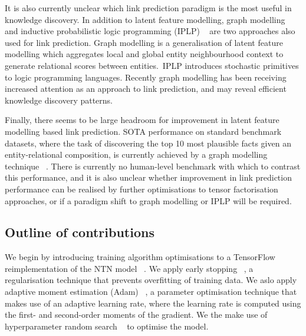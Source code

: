 \noindent It is also currently unclear which link prediction paradigm is the most useful in knowledge discovery. In addition to latent feature modelling, graph modelling \unskip~\citep{niepert2016discriminative, schlichtkrull2018modeling, pinter-eisenstein-2018-predicting} and inductive probabilistic logic programming (IPLP) \unskip ~\citep{speichert2018learning} are two approaches also used for link prediction. Graph modelling is a generalisation of latent feature modelling which aggregates local and global entity neighbourhood context to generate relational scores between entities.\ IPLP introduces stochastic primitives to logic programming languages. Recently graph modelling has been receiving increased attention as an approach to link prediction, and may reveal efficient knowledge discovery patterns. \par

\noindent Finally, there seems to be large headroom for improvement in latent feature modelling based link prediction. SOTA performance on standard benchmark datasets, where the task of discovering the top 10 most plausible facts given an entity-relational composition, is currently achieved by a graph modelling technique \unskip~\citep{ruderNLPProg}. There is currently no human-level benchmark with which to contrast this performance, and it is also unclear whether improvement in link prediction performance can be realised by further optimisations to tensor factorisation approaches, or if a paradigm shift to graph modelling or IPLP will be required.  

\subsection{Outline of contributions}

We begin by introducing training algorithm optimisations to a TensorFlow \unskip~\citep{abadi2016tensorflow} reimplementation of the NTN model \unskip~\citep{Doss2015}.  We apply early stopping \unskip~\citep{prechelt1998early}, a regularisation technique that prevents overfitting of training data. We aslo apply adaptive moment estimation (Adam)  \unskip~\citep{kingma2014adam}, a parameter optimisation technique that makes use of an adaptive learning rate, where the learning rate is computed using the first- and second-order moments of the gradient. We the make use of hyperparameter random search \unskip~\citep{bergstra2012random} to optimise the model. \par

